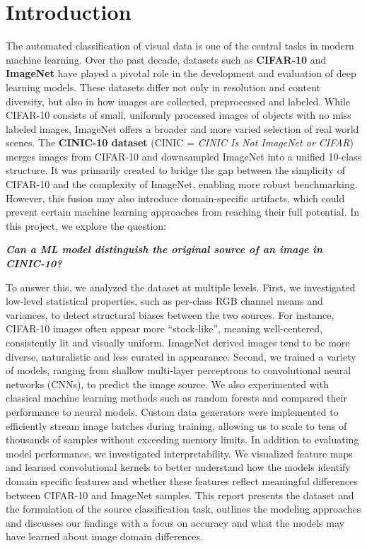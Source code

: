 \section{Introduction}

The automated classification of visual data is one of the central tasks in modern machine learning. Over the past decade, datasets such as \textbf{CIFAR-10} and \textbf{ImageNet} have played a 
pivotal role in the development and evaluation of deep learning models. These datasets differ not only in resolution and content diversity, but also in how images are collected, 
preprocessed and labeled. While CIFAR-10 consists of small, uniformly processed images of objects with no miss labeled images, ImageNet offers a broader and more varied selection 
of real world scenes.
The \textbf{CINIC-10 dataset} (CINIC = \textit{CINIC Is Not ImageNet or CIFAR}) merges images from CIFAR-10 and downsampled ImageNet into a unified 10-class structure. 
It was primarily created to bridge the gap between the simplicity of CIFAR-10 and the complexity of ImageNet, enabling more robust benchmarking. However, this fusion may also 
introduce domain-specific artifacts, which could prevent certain machine learning approaches from reaching their full potential.
In this project, we explore the question:
\begin{center}
\textbf{\textit{Can a ML model distinguish the original source of an image in CINIC-10?}}
\end{center}
To answer this, we analyzed the dataset at multiple levels. First, we investigated low-level statistical properties, such as per-class RGB channel means and variances, to detect structural 
biases between the two sources. For instance, CIFAR-10 images often appear more ``stock-like'', meaning well-centered, consistently lit and visually uniform. ImageNet derived images tend 
to be more diverse, naturalistic and less curated in appearance.
Second, we trained a variety of models, ranging from shallow multi-layer perceptrons to convolutional neural networks (CNNs), to predict the image source. 
We also experimented with classical machine learning methods such as random forests and compared their performance to neural models. 
Custom data generators were implemented to efficiently stream image batches during training, allowing us to scale to tens of thousands of samples without exceeding memory limits.
In addition to evaluating model performance, we investigated interpretability. We visualized feature maps and learned convolutional kernels to better understand how the models identify 
domain specific features and whether these features reflect meaningful differences between CIFAR-10 and ImageNet samples.
This report presents the dataset and the formulation of the source classification task, outlines the modeling approaches and discusses our findings with a 
focus on accuracy and what the models may have learned about image domain differences.

